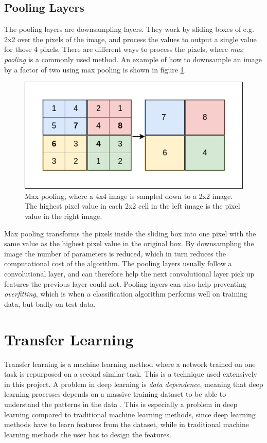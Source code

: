 \vspace{2mm}


\subsection{Pooling Layers}
The pooling layers are downsampling layers. They work by sliding boxes of e.g. 2x2 over the pixels of the image, and process the values to output a single value for those 4 pixels. There are different ways to process the pixels, where \textit{max pooling} is a commonly used method. An example of how to downsample an image by a factor of two using max pooling is shown in figure \ref{fig:max_pool}.

\begin{figure}[h!]
    \centering
    \includegraphics[scale=0.42]{fig/pooling.png}
    \caption{Max pooling, where a 4x4 image is sampled down to a 2x2 image. The highest pixel value in each 2x2 cell in the left image is the pixel value in the right image.}
    \label{fig:max_pool}
\end{figure}

\noindent
Max pooling transforms the pixels inside the sliding box into one pixel with the same value as the highest pixel value in the original box. By downsampling the image the number of parameters is reduced, which in turn reduces the computational cost of the algorithm. The pooling layers usually follow a convolutional layer, and can therefore help the next convolutional layer pick up features the previous layer could not. Pooling layers can also help preventing \textit{overfitting}, which is when a classification algorithm performs well on training data, but badly on test data.

\section{Transfer Learning}
Transfer learning is a machine learning method where a network trained on one task is repurposed on a second similar task. This is a technique used extensively in this project. A problem in deep learning is \textit{data dependence}, meaning that deep learning processes depends on a massive training dataset to be able to understand the patterns in the data \citep{TransferLearning2}. This is especially a problem in deep learning compared to traditional machine learning methods, since deep learning methods have to learn features from the dataset, while in traditional machine learning methods the user has to design the features. 

